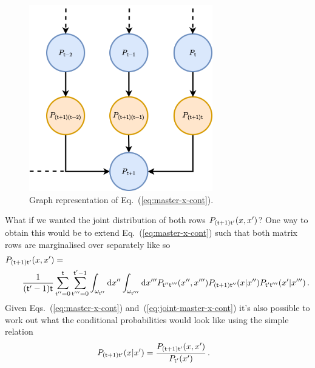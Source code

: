 \begin{figure}[h]
\centering
\includegraphics[width=8cm]{images/master-eq-graph.drawio.png}
\caption{Graph representation of Eq.~(\ref{eq:master-x-cont}).}
\label{fig:master-eqn}
\end{figure}

What if we wanted the joint distribution of both rows $P_{({\sf t}+1){\sf t}'}(x,x')$? One way to obtain this would be to extend Eq.~(\ref{eq:master-x-cont}) such that both matrix rows are marginalised over separately like so
\begin{align}
&P_{({\sf t}+1){\sf t}'}(x,x') = \nonumber \\
&\qquad \frac{1}{({\sf t}'-1){\sf t}}\sum_{{\sf t}''=0}^{{\sf t}}\sum_{{\sf t}'''=0}^{{\sf t}'-1}\int_{\omega_{{\sf t}''}}{\rm d}x''\int_{\omega_{{\sf t}'''}}{\rm d}x''' P_{{\sf t}''{\sf t}'''}(x'', x''') P_{({\sf t}+1){\sf t}''}(x\vert x'')P_{{\sf t}'{\sf t}'''}(x'\vert x''') \label{eq:joint-master-x-cont} \,.
\end{align}
Given Eqs.~(\ref{eq:master-x-cont}) and~(\ref{eq:joint-master-x-cont}) it's also possible to work out what the conditional probabilities would look like using the simple relation
\begin{align}
P_{({\sf t}+1){\sf t}'}(x\vert x') &= \frac{P_{({\sf t}+1){\sf t}'}(x,x')}{P_{{\sf t}'}(x')} \label{eq:cond-master-x-cont} \,.
\end{align}

